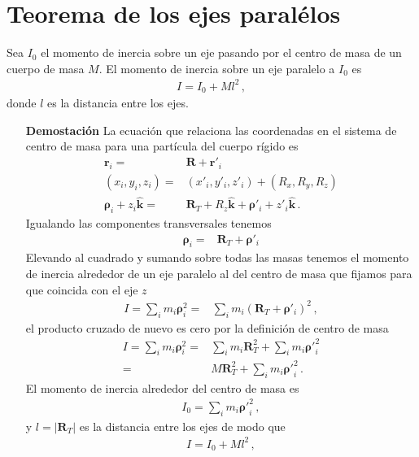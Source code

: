 \section{Teorema de los ejes paralélos}

Sea $I_0$ el momento de inercia sobre un eje pasando por el centro de masa de un cuerpo de masa $M$. El momento de inercia sobre un eje paralelo a $I_0$ es
\begin{align}
  I=I_0+M l^2\,,
\end{align}
donde $l$ es la distancia entre los ejes.

\begin{itemize}
\item[\textbf{Demostación}] La ecuación que relaciona las coordenadas en el sistema de centro de masa para una partícula del cuerpo rígido es
  \begin{align}
    \mathbf{r}_i=&\mathbf{R}+\mathbf{r}'_i\nonumber\\
    (x_i,y_i,z_i)=&(x'_i,y'_i,z'_i)+(R_x,R_y,R_z)\nonumber\\
    \boldsymbol{\rho}_i+z_i\hat{\mathbf{k}}=& \mathbf{R}_T+R_z\hat{\mathbf{k}}+\boldsymbol{\rho}'_i+z'_i\hat{\mathbf{k}}\,.
  \end{align}
Igualando las componentes transversales tenemos
\begin{align}
  \boldsymbol{\rho}_i=& \mathbf{R}_T+\boldsymbol{\rho}'_i
\end{align}
Elevando al cuadrado y sumando sobre todas las masas tenemos el momento de inercia alrededor de un eje paralelo al del centro de masa que fijamos para que coincida con el eje $z$
\begin{align}
  I=\sum_i m_i\boldsymbol{\rho}_i^2=&\sum_i m_i(\mathbf{R}_T+\boldsymbol{\rho}'_i)^2\,,
\end{align}
el producto cruzado de nuevo es cero por la definición de centro de masa
\begin{align}
  I=\sum_i m_i\boldsymbol{\rho}_i^2=&\sum_i m_i\mathbf{R}_T^2+\sum_i m_i{\boldsymbol{\rho}'}_i^2\nonumber\\
  =&M\mathbf{R}_T^2+\sum_i m_i{\boldsymbol{\rho}'}_i^2\,.
\end{align}
El momento de inercia alrededor del centro de masa es
\begin{align}
  I_0=\sum_i m_i{\boldsymbol{\rho}'}_i^2\,,
\end{align}
y $l=\left|\mathbf{R}_T\right|$ es la distancia entre los ejes de modo que
\begin{align}
  I=I_0+M l^2\,,
\end{align}
\end{itemize}


